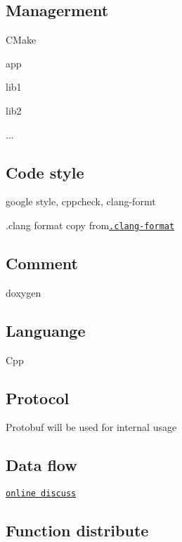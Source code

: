\subsection*{Managerment}

C\+Make
\begin{DoxyItemize}
\item app
\item lib1
\item lib2
\item ...
\end{DoxyItemize}

\subsection*{Code style}

google style, cppcheck, clang-\/formt

.clang format copy from\href{https://github.com/google/jsonnet/blob/master/.clang-format}{\tt .clang-\/format} \subsection*{Comment}

doxygen \subsection*{Languange}

Cpp

\subsection*{Protocol}

Protobuf will be used for internal usage

\subsection*{Data flow}

\href{https://docs.google.com/document/d/1v2jsXLpF7iKs91sIN9Z-M3vjNxYJjjfaGAXDTr3JBIs/edit?usp=sharing}{\tt online discuss}

\subsection*{Function distribute}


